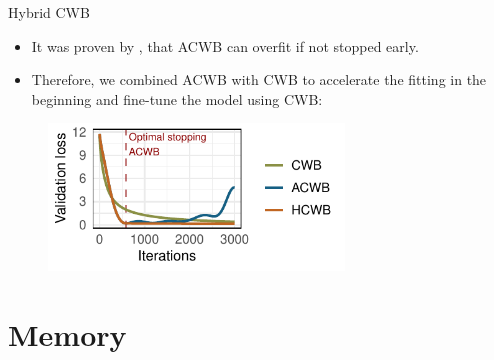 \documentclass[ignorenonframetext,]{beamer}
\providecommand{\tightlist}{%
  \setlength{\itemsep}{0pt}\setlength{\parskip}{0pt}}
\begin{document}
\begin{frame}{Hybrid CWB}
\protect\hypertarget{hybrid-cwb}{}
\begin{itemize}
\tightlist
\item
  It was proven by \citet{lu2020accelerating}, that ACWB can overfit if
  not stopped early.
\item
  Therefore, we combined ACWB with CWB to accelerate the fitting in the
  beginning and fine-tune the model using CWB:
\end{itemize}

\begin{figure}
\centering
\includegraphics[width=0.7\textwidth]{figures/fig-optim-emp-risk.pdf}
\end{figure}
\end{frame}

\hypertarget{memory}{%
\section{Memory}\label{memory}}
\end{document}
